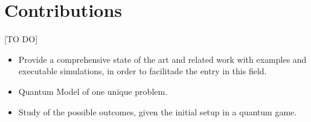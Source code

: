 \section{Contributions}
\label{sec:int_contributions}

[TO DO]

\begin{itemize}

\item Provide a comprehensive state of the art and related work with examples and executable simulations, in order to facilitade the entry in this field.

\item Quantum Model of one unique problem. 

\item Study of the possible outcomes, given the initial setup in a quantum game.

\end{itemize}